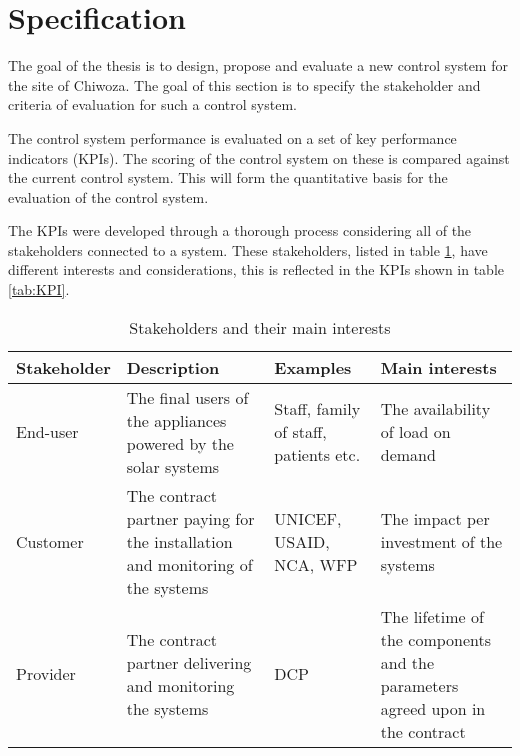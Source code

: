 \section{Specification}\label{seq:specification}
The goal of the thesis is to design, propose and evaluate a new control system for the site of Chiwoza. The goal of this section is to specify the stakeholder and criteria of evaluation for such a control system. 

The control system performance is evaluated on a set of key performance indicators (KPIs). The scoring of the control system on these is compared against the current control system. This will form the quantitative basis for the evaluation of the control system.

The KPIs were developed through a thorough process considering all of the stakeholders connected to a system. These stakeholders, listed in table \ref{tab:stakeholders}, have different interests and considerations, this is reflected in the KPIs shown in table \ref{tab:KPI}. 


\begin{table}[h]
    \centering
    \begin{tabular}{|p{3cm}|p{5cm}|p{2cm}|p{5cm}|}
        \hline
        \textbf{Stakeholder} & \textbf{Description} & \textbf{Examples} & \textbf{Main interests} \\
        \hline
        End-user & The final users of the appliances powered by the solar systems & Staff, family of staff, patients etc. & The availability of load on demand \\
        \hline
        Customer & The contract partner paying for the installation and monitoring of the systems & UNICEF, USAID, NCA, WFP & The impact per investment of the systems \\
        \hline
        Provider & The contract partner delivering and monitoring the systems & DCP & The lifetime of the components and the parameters agreed upon in the contract \\
        \hline
    \end{tabular}
    \caption[Stakeholders]{Stakeholders and their main interests}
    \label{tab:stakeholders}
\end{table}

